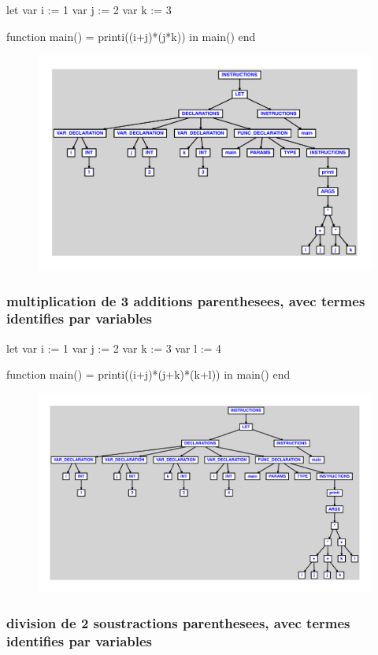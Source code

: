 \documentclass{article}
\begin{document}
\begin{verbatimtab}
let
	var i := 1
	var j := 2
	var k := 3

	function main() = printi((i+j)*(j*k))
in main() end
\end{verbatimtab}
\begin{figure}[H]\centering\includegraphics[max width=\textwidth]{ast/ast_127.pdf}\end{figure}\subsubsection{multiplication de 3 additions parenthesees, avec termes identifies par variables}
\begin{verbatimtab}
let
	var i := 1
	var j := 2
	var k := 3
	var l := 4

	function main() = printi((i+j)*(j+k)*(k+l))
in main() end
\end{verbatimtab}
\begin{figure}[H]\centering\includegraphics[max width=\textwidth]{ast/ast_128.pdf}\end{figure}\subsubsection{division de 2 soustractions parenthesees, avec termes identifies par variables}
\end{document}
